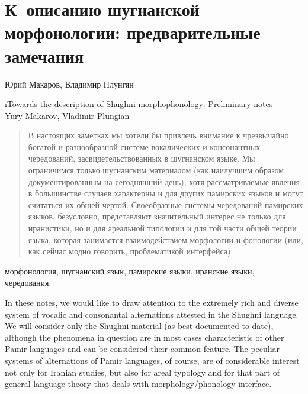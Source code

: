 \chapter*{К~описанию шугнанской морфонологии: предварительные замечания}
\setcounter{section}{0}
\label{chapter-makplun-morphon}

\begin{customauthorname}
Юрий Макаров, Владимир Плунгян
\end{customauthorname}

\begin{englishtitle}
\i{Towards the description of Shughni morphophonology: Preliminary notes\\{\small Yury Makarov, Vladimir Plungian}}
\end{englishtitle}

\begin{abstract}
В настоящих заметках мы хотели бы привлечь внимание к чрезвычайно богатой и разнообразной системе вокалических и консонантных чередований, засвидетельствованных в шугнанском языке. Мы ограничимся только шугнанским материалом (как наилучшим образом документированным на сегодняшний день), хотя рассматриваемые явления в большинстве случаев характерны и для других памирских языков и могут считаться их общей чертой. Своеобразные системы чередований памирских языков, безусловно, представляют значительный интерес не только для иранистики, но и для ареальной типологии и для той части общей теории языка, которая занимается взаимодействием морфологии и фонологии (или, как сейчас модно говорить, проблематикой интерфейса).
\end{abstract}

\begin{keywords}
морфонология, шугнанский язык, памирские языки, иранские языки, чередования.
\end{keywords}

\begin{eng-abstract}
In these notes, we would like to draw attention to the extremely rich and diverse system of vocalic and consonantal alternations attested in the Shughni language. We will consider only the Shughni material (as best documented to date), although the phenomena in question are in most cases characteristic of other Pamir languages and can be considered their common feature. The peculiar systems of alternations of Pamir languages, of course, are of considerable interest not only for Iranian studies, but also for areal typology and for that part of general language theory that deals with morphology/phonology interface.
\end{eng-abstract}

